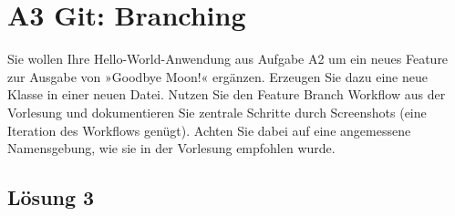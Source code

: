 \documentclass[main.tex]{subfiles}
\begin{document}
\section{A3 Git: Branching}
Sie wollen Ihre Hello-World-Anwendung aus Aufgabe A2 um ein neues Feature zur Ausgabe von
»Goodbye Moon!« ergänzen. Erzeugen Sie dazu eine neue Klasse in einer neuen Datei. Nutzen
Sie den Feature Branch Workflow aus der Vorlesung und dokumentieren Sie zentrale Schritte
durch Screenshots (eine Iteration des Workflows genügt). Achten Sie dabei auf eine angemessene
Namensgebung, wie sie in der Vorlesung empfohlen wurde.

\subsection{Lösung 3}
\end{document}

